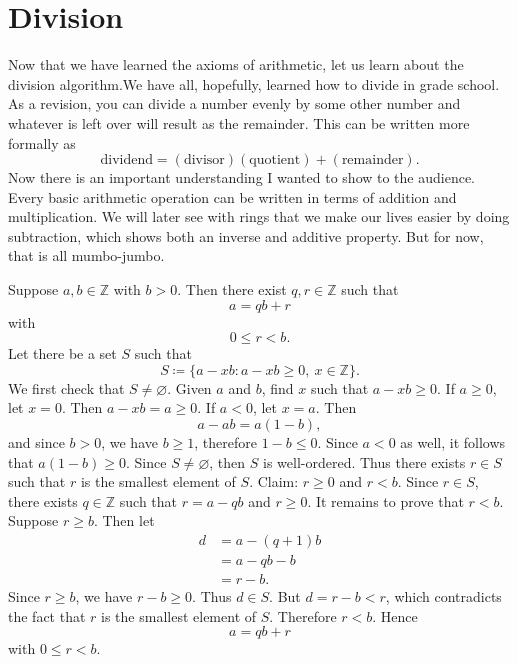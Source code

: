 
\section{Division}

Now that we have learned the axioms of arithmetic, let us learn about the division algorithm.We have all, hopefully, learned how to divide in grade school.
As a revision, you can divide a number evenly by some other number and whatever is left over will result as the remainder.
This can be written more formally as
\[
    \text{dividend} = (\text{divisor})(\text{quotient}) + (\text{remainder}).
\]
Now there is an important understanding I wanted to show to the audience.
Every basic arithmetic operation can be written in terms of addition and multiplication.
We will later see with rings that we make our lives easier by doing subtraction, which shows both an inverse and additive property.
But for now, that is all mumbo-jumbo.
\begin{theorem}{
    Suppose $a,b\in\mathbb{Z}$ with $b>0$.
    Then there exist $q,r\in\mathbb{Z}$ such that
    \[
        a = qb + r
    \]
    with
    \[
        0\leq r < b.
    \]
}
    Let there be a set $S$ such that
    \[
        S \coloneqq \{a-xb : a-xb\geq 0,\ x\in\mathbb{Z}\}.
    \]
    We first check that $S\neq \varnothing$.
    Given $a$ and $b$, find $x$ such that $a-xb\geq 0$.
    If $a\geq 0$, let $x = 0$.
    Then $a-xb = a\geq 0$.
    If $a<0$, let $x = a$.
    Then
    \[
        a - ab = a(1 - b),
    \]
    and since $b>0$, we have $b\geq 1$, therefore $1-b\leq 0$.
    Since $a<0$ as well, it follows that $a(1-b)\geq 0$.
    Since $S\neq \varnothing$, then $S$ is well-ordered.
    Thus there exists $r\in S$ such that $r$ is the smallest element of $S$.
    Claim:
    $r\geq 0$ and $r < b$.
    Since $r\in S$, there exists $q\in\mathbb{Z}$ such that $r = a-qb$ and $r\geq 0$.
    It remains to prove that $r < b$.
    Suppose $r\geq b$.
    Then let
    \begin{align*}
        d &= a - (q + 1)b\\
        &= a - qb - b\\
        &= r - b.
    \end{align*}
    Since $r\geq b$, we have $r-b\geq 0$.
    Thus $d\in S$.
    But $d = r-b < r$, which contradicts the fact that $r$ is the smallest element of $S$.
    Therefore $r < b$.
    Hence
    \[
        a = qb + r
    \]
    with $0\leq r < b$.
\end{theorem}

